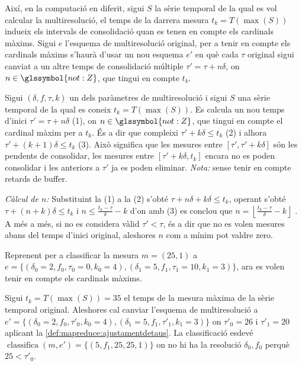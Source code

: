 Així, en la computació en diferit, sigui $S$ la sèrie temporal de la
qual es vol calcular la multiresolució, el temps de la darrera mesura
$t_k=T(\max(S))$ indueix els intervals de consolidació quan es tenen en
compte els cardinals màxims. Sigui $e$ l'esquema de multiresolució
original, per a tenir en compte els cardinals màxims s'haurà d'usar un
nou esquema $e'$ en què cada $\tau$ original sigui canviat a un altre
temps de consolidació múltiple $\tau'= \tau+n\delta$, on
$n\in\glssymbol{not:Z}$, que tingui en compte $t_k$.



\begin{definition}
  \label{def:mapreduce:ajustamentdetaus}

  Sigui $(\delta,f,\tau,k)$ un dels paràmetres de multiresolució i
  sigui $S$ una sèrie temporal de la qual es coneix $t_k=T(\max(S))$.
  Es calcula un nou temps d'inici $\tau'= \tau+n\delta$ (1), on
  $n\in\glssymbol{not:Z}$, que tingui en compte el cardinal màxim per
  a $t_k$. És a dir que compleixi $\tau'+k\delta \leq t_k$ (2) i
  alhora $\tau'+(k+1)\delta \leq t_k$ (3).  Això significa
  que les mesures entre $[\tau',\tau'+k\delta]$ són les pendents de
  consolidar, les mesures entre $[\tau'+k\delta,t_k]$ encara no es
  poden consolidar i les anteriors a $\tau'$ ja es poden
  eliminar. \emph{Nota:} sense tenir en compte retards de buffer.


  \emph{Càlcul de $n$:} Substituint la (1) a la (2) s'obté
  $\tau+n\delta+k\delta \leq t_k$, operant s'obté $\tau+(n+k)\delta
  \leq t_k$ i $n \leq \frac{t_k-\tau}{\delta}-k$ d'on amb (3) es
  conclou que $n = \left\lfloor \frac{t_k-\tau}{\delta}-k
  \right\rfloor$ .  A més a més, si no es considera vàlid
  $\tau'<\tau$, és a dir que no es volen mesures abans del temps
  d'inici original, aleshores $n$ com a mínim pot valdre zero.

\end{definition}



\begin{example}
  \label{ex:mapreduce:classifica-ajustament}
  Reprenent  per a
  classificar la mesura $m=(25,1)$ a
  $e=\{(\delta_0=2,f_0,\tau_0=0,k_0=4),(\delta_1=5,f_1,\tau_1=10,k_1=3)\}$,
  ara es volen tenir en compte els cardinals màxims.
    
  Sigui $t_k=T(\max(S))=35$ el temps de la mesura màxima de la sèrie
  temporal original. Aleshores cal canviar l'esquema de multiresolució
  a
  $e'=\{(\delta_0=2,f_0,\tau'_0,k_0=4),(\delta_1=5,f_1,\tau'_1,k_1=3)\}$
  on $\tau'_0=26$ i $\tau'_1=20$ aplicant la
  \autoref{def:mapreduce:ajustamentdetaus}. La classificació esdevé
  $\operatorname{classifica}(m,e')=\{ (5,f_1,25,25,1) \}$ on no hi ha
  la resolució $\delta_0,f_0$ perquè $25< \tau'_0$.
\end{example}



